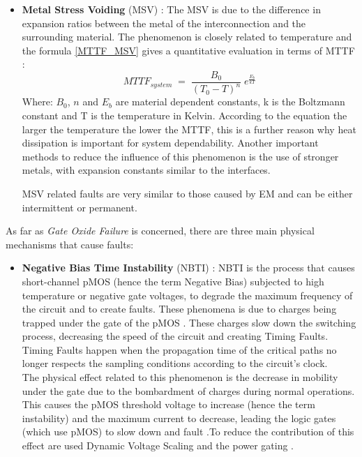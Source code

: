 {{{\begin{itemize}
				Electromigration create both permanent or intermittent faults and leads the chip in the wear-out phase. As we have seen this phenomena is related to current density that normally depends on workload, hence architecture and system fault tolerant strategy for EM reduction lead with resource multiplexing and oversizing.
				
				\item \textbf{Metal Stress Voiding} (MSV) :  The MSV is due to the difference in expansion ratios between the metal of the interconnection and the surrounding material. The phenomenon is closely related to temperature and the formula \ref{MTTF_MSV} gives a quantitative evaluation in terms of MTTF :
				\begin{equation} \label{MTTF_MSV}
					MTTF_{system} \;=\; \frac{B_0}{(T_0-T)^n}\;e^{\frac{E_b}{kT}} 
				\end{equation}
				Where:  $B_0$, $n$ and $E_b$ are material dependent constants, k is the Boltzmann constant and T is the temperature in Kelvin. According to the equation the larger the temperature the lower the MTTF, this is a further reason why heat dissipation is important for system dependability. Another important methods to reduce the influence of this phenomenon is the use of stronger metals, with expansion constants similar to the interfaces.

				MSV related faults are very similar to those caused by EM and can be either intermittent or permanent.
			\end{itemize}
		
			
			As far as \textit{Gate Oxide Failure} is concerned, there are three main physical mechanisms that cause faults:
			\begin{itemize}
				\item \textbf{Negative Bias Time Instability} (NBTI) : NBTI is the process that causes short-channel pMOS (hence the term Negative Bias) subjected to high temperature or negative gate voltages, to degrade the maximum frequency of the circuit and to create faults. These phenomena is due to charges being trapped under the gate of the pMOS  .
				These charges slow down the switching process, decreasing the speed of the circuit and creating Timing Faults. Timing Faults happen when the propagation time of the critical paths no longer respects the sampling conditions according to the circuit's clock. \\
				
				The physical effect related to this phenomenon is the decrease in mobility under the gate due to the bombardment of charges during normal operations. This causes the pMOS threshold voltage to increase (hence the term instability) and the maximum current to decrease, leading the logic gates (which use pMOS) to slow down and fault .To reduce the contribution of this effect are used Dynamic Voltage Scaling and the power gating   .
				

\end{itemize}}}}

